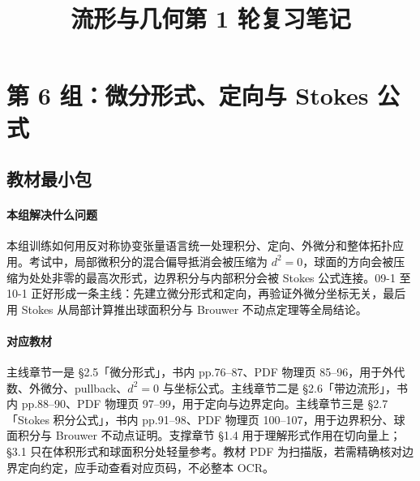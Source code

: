\documentclass[12pt,a4paper]{ctexart}
\title{流形与几何第 1 轮复习笔记}
\author{}
\date{}
\begin{document}
\maketitle

\section{第 6 组：微分形式、定向与 Stokes 公式}

\subsection*{教材最小包}

\paragraph{本组解决什么问题}
本组训练如何用反对称协变张量语言统一处理积分、定向、外微分和整体拓扑应用。考试中，局部微积分的混合偏导抵消会被压缩为 $d^2=0$，球面的方向会被压缩为处处非零的最高次形式，边界积分与内部积分会被 Stokes 公式连接。09-1 至 10-1 正好形成一条主线：先建立微分形式和定向，再验证外微分坐标无关，最后用 Stokes 从局部计算推出球面积分与 Brouwer 不动点定理等全局结论。

\paragraph{对应教材}
主线章节一是 \S 2.5「微分形式」，书内 pp.76--87、PDF 物理页 85--96，用于外代数、外微分、pullback、$d^2=0$ 与坐标公式。主线章节二是 \S 2.6「带边流形」，书内 pp.88--90、PDF 物理页 97--99，用于定向与边界定向。主线章节三是 \S 2.7「Stokes 积分公式」，书内 pp.91--98、PDF 物理页 100--107，用于边界积分、球面积分与 Brouwer 不动点证明。支撑章节 \S 1.4 用于理解形式作用在切向量上；\S 3.1 只在体积形式和球面积分处轻量参考。教材 PDF 为扫描版，若需精确核对边界定向约定，应手动查看对应页码，不必整本 OCR。
\end{document}
